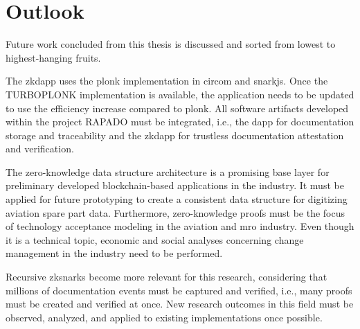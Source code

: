 \section{Outlook}
Future work concluded from this thesis is discussed and sorted from lowest to highest-hanging fruits.

The \acrshort{zkdapp} uses the \acrshort{plonk} implementation in circom and snarkjs. Once the TURBOPLONK implementation is available, the application needs to be updated to use the efficiency increase compared to \acrshort{plonk}. All software artifacts developed within the project RAPADO must be integrated, i.e., the \acrshort{dapp} for documentation storage and traceability and the \acrshort{zkdapp} for trustless documentation attestation and verification. 

The zero-knowledge data structure architecture is a promising base layer for preliminary developed blockchain-based applications in the industry. It must be applied for future prototyping to create a consistent data structure for digitizing aviation spare part data. Furthermore, zero-knowledge proofs must be the focus of technology acceptance modeling in the aviation and \acrshort{mro} industry. Even though it is a technical topic, economic and social analyses concerning change management in the industry need to be performed. 

Recursive \acrshort{zksnark}s become more relevant for this research, considering that millions of documentation events must be captured and verified, i.e., many proofs must be created and verified at once. New research outcomes in this field must be observed, analyzed, and applied to existing implementations once possible.